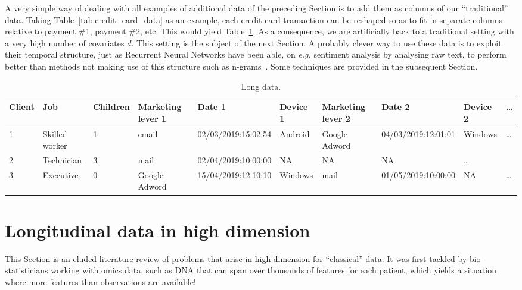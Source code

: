 A very simple way of dealing with all examples of additional data of the preceding Section is to add them as columns of our ``traditional'' data. Taking Table~\ref{tab:credit_card_data} as an example, each credit card transaction can be reshaped so as to fit in separate columns relative to payment \#1, payment \#2, etc. This would yield Table~\ref{tab:example_longitudinal}. As a consequence, we are artificially back to a traditional setting with a very high number of covariates $d$. This setting is the subject of the next Section. A probably clever way to use these data is to exploit their temporal structure, just as Recurrent Neural Networks have been able, on \textit{e.g.} sentiment analysis by analysing raw text, to perform better than methods not making use of this structure such as n-grams~\cite{}. Some techniques are provided in the subsequent Section.



\begin{table}[ht]
    \centering
    \caption{Long data.}
    \label{tab:example_longitudinal}
    \begin{tiny}
\begin{tabular}{llllllllll}
Client & Job & Children & Marketing lever 1 & Date 1 & Device 1 & Marketing lever 2 & Date 2 & Device 2 & \dots \\
 \hline
1 & Skilled worker & 1 & email & 02/03/2019:15:02:54 & Android & Google Adword & 04/03/2019:12:01:01 & Windows & \dots \\
2 & Technician & 3 & mail & 02/04/2019:10:00:00 & NA & NA & NA & \dots\\
3 & Executive & 0 & Google Adword & 15/04/2019:12:10:10 & Windows & mail & 01/05/2019:10:00:00 & NA & \dots \\
\end{tabular}
    \end{tiny}
\end{table}


\section{Longitudinal data in high dimension}

This Section is an eluded literature review of problems that arise in high dimension for ``classical'' data. It was first tackled by bio-statisticians working with omics data, such as DNA that can span over thousands of features for each patient, which yields a situation where more features than observations are available!

